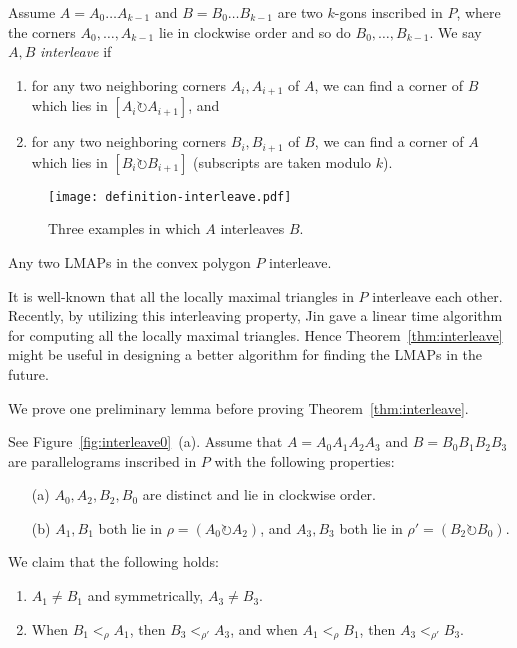 \documentclass{ws-ijcga}
\begin{document}
\begin{definition}[Interleaving]\label{def:interleaving}
Assume $A=A_0\ldots A_{k-1}$ and $B=B_0\ldots B_{k-1}$ are two $k$-gons inscribed in $P$,
  where the corners $A_0,\ldots,A_{k-1}$ lie in clockwise order and so do $B_0,\ldots,B_{k-1}$.
We say $A,B$ \emph{interleave} if
\begin{enumerate}
\item for any two neighboring corners $A_i,A_{i+1}$ of $A$, we can find a corner of $B$ which lies in $[A_i\circlearrowright A_{i+1}]$, and
\item for any two neighboring corners $B_i,B_{i+1}$ of $B$, we can find a corner of $A$ which lies in $[B_i\circlearrowright B_{i+1}]$ (subscripts are taken modulo $k$).
\end{enumerate}
\end{definition}

\begin{figure}[h]
\centering\texttt{[image: definition-interleave.pdf]}
\caption{Three examples in which $A$ interleaves $B$.}\label{fig:interleave-examples}
\end{figure}

\begin{theorem}[Auxiliary]\label{thm:interleave}
Any two LMAPs in the convex polygon $P$ interleave.
\end{theorem}

\begin{remark}\label{remark:interleave}
It is well-known that all the locally maximal triangles in $P$ interleave each other.
Recently, by utilizing this interleaving property,
  Jin \cite{Triangle-ultimate-Arxiv} gave a linear time algorithm for computing all the locally maximal triangles.
Hence Theorem~\ref{thm:interleave} might be useful in designing a better algorithm for finding the LMAPs in the future.
\end{remark}

We prove one preliminary lemma before proving Theorem~\ref{thm:interleave}.

\begin{lemma}\label{lemma:inter-pre}
See Figure~\ref{fig:interleave0}~(a).
Assume that $A=A_0A_1A_2A_3$ and $B=B_0B_1B_2B_3$ are parallelograms inscribed in $P$ with the following properties:
\begin{enumerate}
\item[(a)] $A_0,A_2,B_2,B_0$ are distinct and lie in clockwise order.
\item[(b)] $A_1,B_1$ both lie in $\rho=(A_0\circlearrowright A_2)$, and $A_3,B_3$ both lie in $\rho'=(B_2\circlearrowright B_0)$.
\end{enumerate}
We claim that the following holds:
\begin{enumerate}
\item $A_1\neq B_1$ and symmetrically, $A_3 \neq B_3$.
\item When $B_1<_\rho A_1$, then $B_3<_{\rho'}A_3$, and when $A_1<_\rho B_1$, then $A_3<_{\rho'} B_3$.
\end{enumerate}
\end{lemma}
\end{document}
